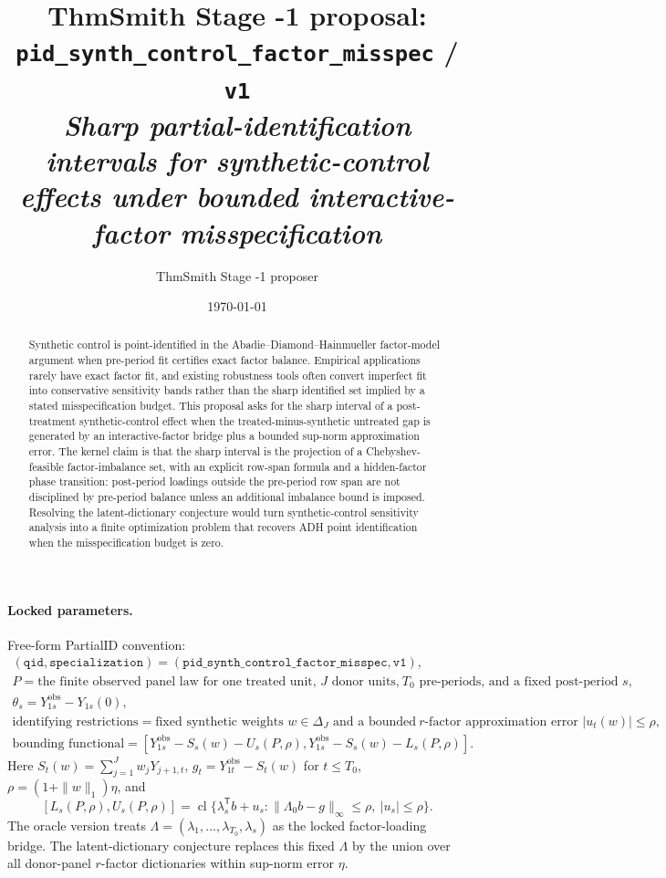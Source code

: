 \documentclass[11pt]{article}
\title{ThmSmith Stage -1 proposal: \texttt{pid\_synth\_control\_factor\_misspec} / \texttt{v1}%
  \\ \large\textit{Sharp partial-identification intervals for synthetic-control effects under bounded interactive-factor misspecification}}
\author{ThmSmith Stage -1 proposer}
\date{\today}
\newcommand{\transpose}{\mathsf{T}}
\theoremstyle{definition}
\theoremstyle{plain}
\theoremstyle{remark}
\begin{document}
\maketitle


\paragraph{Locked parameters.}
Free-form PartialID convention:
\[
\begin{gathered}
(\texttt{qid},\texttt{specialization})=
(\texttt{pid\_synth\_control\_factor\_misspec},\texttt{v1}),\\
P=\text{the finite observed panel law for one treated unit, }J\text{ donor units,}
\ T_0\text{ pre-periods, and a fixed post-period }s,\\
\theta_s=Y^{\mathrm{obs}}_{1s}-Y_{1s}(0),\\
\text{identifying restrictions}=
\text{fixed synthetic weights }w\in\Delta_J\text{ and a bounded}
\ r\text{-factor approximation error }|u_t(w)|\le \rho,\\
\text{bounding functional}=
[Y^{\mathrm{obs}}_{1s}-S_s(w)-U_s(P,\rho),
Y^{\mathrm{obs}}_{1s}-S_s(w)-L_s(P,\rho)].
\end{gathered}
\]
Here \(S_t(w)=\sum_{j=1}^J w_jY_{j+1,t}\), \(g_t=Y^{\mathrm{obs}}_{1t}-S_t(w)\) for \(t\le T_0\), \(\rho=(1+\|w\|_1)\eta\), and
\[
[L_s(P,\rho),U_s(P,\rho)]
=\operatorname{cl}\{\lambda_s^\transpose b+u_s:
\|\Lambda_0b-g\|_\infty\le\rho,\ |u_s|\le\rho\}.
\]
The oracle version treats \(\Lambda=(\lambda_1,\ldots,\lambda_{T_0},\lambda_s)\) as the locked factor-loading bridge. The latent-dictionary conjecture replaces this fixed \(\Lambda\) by the union over all donor-panel \(r\)-factor dictionaries within sup-norm error \(\eta\).

\begin{abstract}
Synthetic control is point-identified in the Abadie--Diamond--Hainmueller factor-model argument when pre-period fit certifies exact factor balance. Empirical applications rarely have exact factor fit, and existing robustness tools often convert imperfect fit into conservative sensitivity bands rather than the sharp identified set implied by a stated misspecification budget. This proposal asks for the sharp interval of a post-treatment synthetic-control effect when the treated-minus-synthetic untreated gap is generated by an interactive-factor bridge plus a bounded sup-norm approximation error. The kernel claim is that the sharp interval is the projection of a Chebyshev-feasible factor-imbalance set, with an explicit row-span formula and a hidden-factor phase transition: post-period loadings outside the pre-period row span are not disciplined by pre-period balance unless an additional imbalance bound is imposed. Resolving the latent-dictionary conjecture would turn synthetic-control sensitivity analysis into a finite optimization problem that recovers ADH point identification when the misspecification budget is zero.
\end{abstract}
\end{document}
